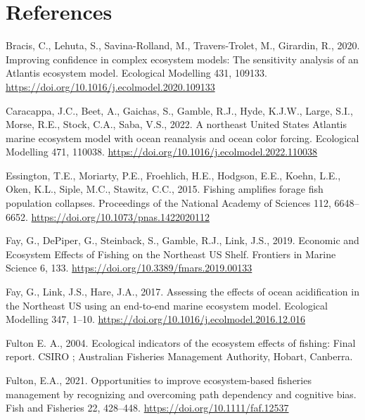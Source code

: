\documentclass[
]{article}
\newlength{\cslhangindent}
\newenvironment{CSLReferences}[2] %
 {\begin{list}{}{%
  \setlength{\itemindent}{0pt}
  \setlength{\leftmargin}{0pt}
  \setlength{\parsep}{0pt}
  \ifodd #1
   \setlength{\leftmargin}{\cslhangindent}
   \setlength{\itemindent}{-1\cslhangindent}
  \fi
  \setlength{\itemsep}{#2\baselineskip}}}
 {\end{list}}
\begin{document}
\clearpage
\FloatBarrier

\section{References}\label{references}

\label{refs}
\begin{CSLReferences}{1}{0}
Bracis, C., Lehuta, S., Savina-Rolland, M., Travers-Trolet, M., Girardin, R., 2020. Improving confidence in complex ecosystem models: {The} sensitivity analysis of an {Atlantis} ecosystem model. Ecological Modelling 431, 109133. \url{https://doi.org/10.1016/j.ecolmodel.2020.109133}

Caracappa, J.C., Beet, A., Gaichas, S., Gamble, R.J., Hyde, K.J.W., Large, S.I., Morse, R.E., Stock, C.A., Saba, V.S., 2022. A northeast {United States Atlantis} marine ecosystem model with ocean reanalysis and ocean color forcing. Ecological Modelling 471, 110038. \url{https://doi.org/10.1016/j.ecolmodel.2022.110038}

Essington, T.E., Moriarty, P.E., Froehlich, H.E., Hodgson, E.E., Koehn, L.E., Oken, K.L., Siple, M.C., Stawitz, C.C., 2015. Fishing amplifies forage fish population collapses. Proceedings of the National Academy of Sciences 112, 6648--6652. \url{https://doi.org/10.1073/pnas.1422020112}

Fay, G., DePiper, G., Steinback, S., Gamble, R.J., Link, J.S., 2019. Economic and {Ecosystem Effects} of {Fishing} on the {Northeast US Shelf}. Frontiers in Marine Science 6, 133. \url{https://doi.org/10.3389/fmars.2019.00133}

Fay, G., Link, J.S., Hare, J.A., 2017. Assessing the effects of ocean acidification in the {Northeast US} using an end-to-end marine ecosystem model. Ecological Modelling 347, 1--10. \url{https://doi.org/10.1016/j.ecolmodel.2016.12.016}

Fulton E. A., 2004. Ecological indicators of the ecosystem effects of fishing: Final report. CSIRO ; Australian Fisheries Management Authority, Hobart, Canberra.

Fulton, E.A., 2021. Opportunities to improve ecosystem-based fisheries management by recognizing and overcoming path dependency and cognitive bias. Fish and Fisheries 22, 428--448. \url{https://doi.org/10.1111/faf.12537}


\end{CSLReferences}
\end{document}
